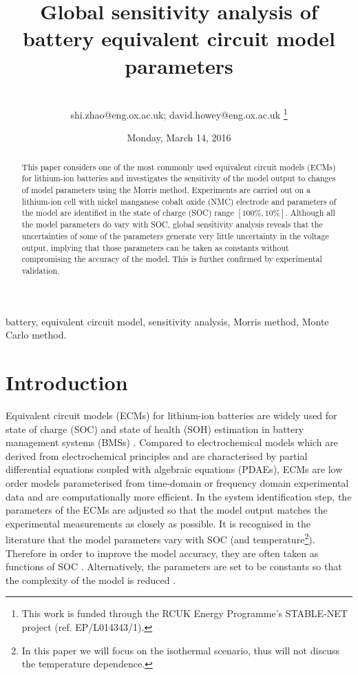 \documentclass[letterpaper,twocolumn]{IEEEtran}
\author{\IEEEauthorblockN{Shi Zhao and David A. Howey \\}
\IEEEauthorblockA{
Department~of~Engineering~Science\\
University~of~Oxford\\
Oxford, United~Kingdom}\\
shi.zhao@eng.ox.ac.uk; david.howey@eng.ox.ac.uk
\thanks{This work is funded through the RCUK Energy Programme's STABLE-NET project (ref. EP/L014343/1).}}
\title{Global sensitivity analysis of battery equivalent circuit model parameters}
\date{Monday, March 14, 2016}
\begin{document}
\maketitle
\begin{abstract}
This paper considers one of the most commonly used equivalent circuit models (ECMs) for lithium-ion batteries and investigates the sensitivity of the model output to changes of model parameters using the Morris method. Experiments are carried out on a lithium-ion cell with nickel manganese cobalt oxide (NMC) electrode and parameters of the model are identified in the state of charge (SOC) range $[100\%,10\%]$. Although all the model parameters do vary with SOC, global sensitivity analysis reveals that the uncertainties of some of the parameters generate very little uncertainty in the voltage output, implying that those parameters can be taken as constants without compromising the accuracy of the model. This is further confirmed by experimental validation.
\end{abstract}

\begin{IEEEkeywords}
battery, equivalent circuit model, sensitivity analysis, Morris method, Monte Carlo method.
\end{IEEEkeywords}

\section{Introduction}
Equivalent circuit models (ECMs) for lithium-ion batteries are widely used for state of charge (SOC) and state of health (SOH) estimation in battery management systems (BMSs) \cite{hu2012comparative}. Compared to electrochemical models which are derived from electrochemical principles and are characterised by partial differential equations coupled with algebraic equations (PDAEs), ECMs are low order models parameterised from time-domain or frequency domain experimental data and are computationally more efficient. In the system identification step, the parameters of the ECMs are adjusted so that the model output matches the experimental measurements as closely as possible. It is recognised in the literature that the model parameters vary with SOC (and temperature\footnote{In this paper we will focus on the isothermal scenario, thus will not discuss the temperature dependence.}). Therefore in order to improve the model accuracy, they are often taken as functions of SOC \cite{hu2012robustness}. Alternatively, the parameters are set to be constants so that the complexity of the model is reduced \cite{zhao2015observability}.
\end{document}
